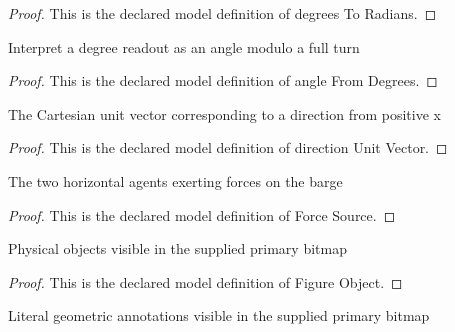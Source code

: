 \begin{proof}
  This is the declared model definition of degrees To Radians.
\end{proof}
\begin{definition}
  \label{def:physics:phyx-mini-0760:phyxminiproblems-problemphyxmini0760-anglefromdegrees}
  Interpret a degree readout as an angle modulo a full turn
\end{definition}
\begin{proof}
  This is the declared model definition of angle From Degrees.
\end{proof}
\begin{definition}
  \label{def:physics:phyx-mini-0760:phyxminiproblems-problemphyxmini0760-directionunitvector}
  The Cartesian unit vector corresponding to a direction from positive x
\end{definition}
\begin{proof}
  This is the declared model definition of direction Unit Vector.
\end{proof}
\begin{definition}
  \label{def:physics:phyx-mini-0760:phyxminiproblems-problemphyxmini0760-forcesource}
  The two horizontal agents exerting forces on the barge
\end{definition}
\begin{proof}
  This is the declared model definition of Force Source.
\end{proof}
\begin{definition}
  \label{def:physics:phyx-mini-0760:phyxminiproblems-problemphyxmini0760-figureobject}
  Physical objects visible in the supplied primary bitmap
\end{definition}
\begin{proof}
  This is the declared model definition of Figure Object.
\end{proof}
\begin{definition}
  \label{def:physics:phyx-mini-0760:phyxminiproblems-problemphyxmini0760-figureannotation}
  Literal geometric annotations visible in the supplied primary bitmap
\end{definition}
